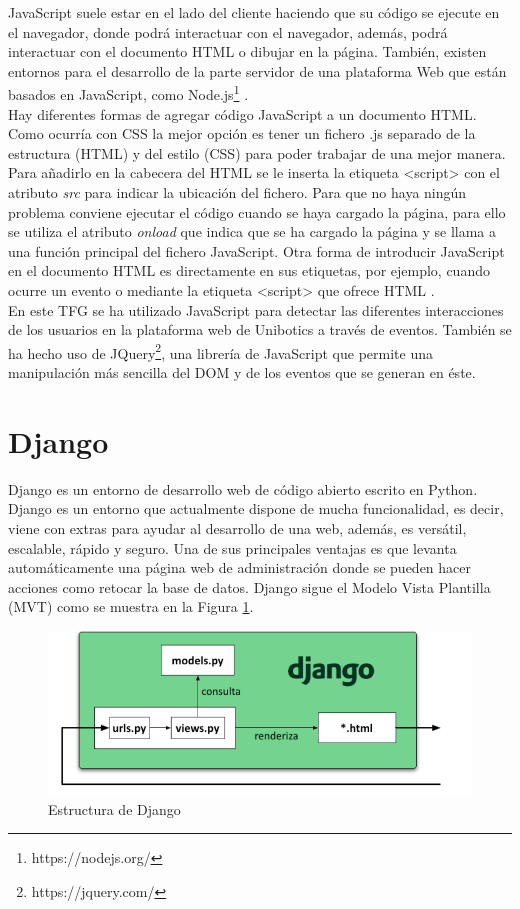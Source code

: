 JavaScript suele estar en el lado del cliente haciendo que su código se ejecute en el navegador, donde podrá interactuar con el navegador, además, podrá interactuar con el documento HTML o dibujar en la página. También, existen entornos para el desarrollo de la parte servidor de una plataforma Web que están basados en JavaScript, como Node.js\footnote{https://nodejs.org/} \cite{juan4}.\\

Hay diferentes formas de agregar código JavaScript a un documento HTML. Como ocurría con CSS la mejor opción es tener un fichero .js separado de la estructura (HTML) y del estilo (CSS) para poder trabajar de una mejor manera. Para añadirlo en la cabecera del HTML se le inserta la etiqueta {\textless script\textgreater} con el atributo \textit{src} para indicar la ubicación del fichero. Para que no haya ningún problema conviene ejecutar el código cuando se haya cargado la página, para ello se utiliza el atributo \textit{onload} que indica que se ha cargado la página y se llama a una función principal del fichero JavaScript. Otra forma de introducir JavaScript en el documento HTML es directamente en sus etiquetas, por ejemplo, cuando ocurre un evento o mediante la etiqueta {\textless script\textgreater} que ofrece HTML \cite{js}.\\

En este TFG se ha utilizado JavaScript para detectar las diferentes interacciones de los usuarios en la plataforma web de Unibotics a través de eventos. También se ha hecho uso de JQuery\footnote{https://jquery.com/}, una librería de JavaScript que permite una manipulación más sencilla del DOM y de los eventos que se generan en éste. 

\section{Django}
Django es un entorno de desarrollo web de código abierto escrito en Python. Django es un entorno que actualmente dispone de mucha funcionalidad, es decir, viene con extras para ayudar al desarrollo de una web, además, es versátil, escalable, rápido y seguro. Una de sus principales ventajas es que  levanta automáticamente una página web de administración donde se pueden hacer acciones como retocar la base de datos. Django sigue el Modelo Vista Plantilla (MVT) como se muestra en la Figura \ref{fig:django}.\\

\begin{figure}[H]
    \centering
    \includegraphics[width=12cm, keepaspectratio]{img/django.png}
    \caption{Estructura de Django}
    \label{fig:django}
\end{figure}

